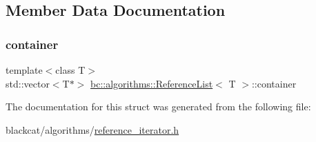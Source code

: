 \subsection{Member Data Documentation}
\mbox{\label{structbc_1_1algorithms_1_1ReferenceList_a3928763c926758f082377b61aa7d8c32}} 
\subsubsection{\texorpdfstring{container}{container}}
{\footnotesize\ttfamily template$<$class T$>$ \\
std\+::vector$<$T$\ast$$>$ \hyperlink{structbc_1_1algorithms_1_1ReferenceList}{bc\+::algorithms\+::\+Reference\+List}$<$ T $>$\+::container}



The documentation for this struct was generated from the following file\+:\begin{DoxyCompactItemize}
\item 
blackcat/algorithms/\hyperlink{reference__iterator_8h}{reference\+\_\+iterator.\+h}\end{DoxyCompactItemize}
